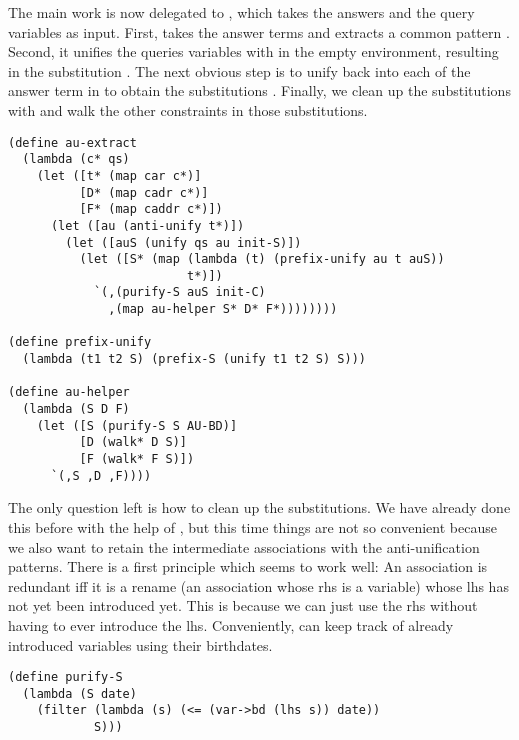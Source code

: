 The main work is now delegated to , which takes the answers and the query variables as input. First,  takes the answer terms  and extracts a common pattern . Second, it unifies the queries variables with  in the empty environment, resulting in the substitution . The next obvious step is to unify  back into each of the answer term in  to obtain the substitutions . Finally, we clean up the substitutions with  and walk the other constraints in those substitutions.
\begin{lstlisting}
(define au-extract
  (lambda (c* qs)
    (let ([t* (map car c*)]
          [D* (map cadr c*)]
          [F* (map caddr c*)])
      (let ([au (anti-unify t*)])
        (let ([auS (unify qs au init-S)])
          (let ([S* (map (lambda (t) (prefix-unify au t auS))
                         t*)])
            `(,(purify-S auS init-C)
              ,(map au-helper S* D* F*))))))))

(define prefix-unify
  (lambda (t1 t2 S) (prefix-S (unify t1 t2 S) S)))

(define au-helper
  (lambda (S D F)
    (let ([S (purify-S S AU-BD)]
          [D (walk* D S)]
          [F (walk* F S)])
      `(,S ,D ,F))))
\end{lstlisting}

The only question left is how to clean up the substitutions. We have already done this before with the help of , but this time things are not so convenient because we also want to retain the intermediate associations with the anti-unification patterns. There is a first principle which seems to work well: An association is redundant iff it is a rename (an association whose rhs is a variable) whose lhs has not yet been introduced yet. This is because we can just use the rhs without having to ever introduce the lhs. Conveniently,  can keep track of already introduced variables using their birthdates.
\begin{lstlisting}
(define purify-S
  (lambda (S date)
    (filter (lambda (s) (<= (var->bd (lhs s)) date))
            S)))
\end{lstlisting}

